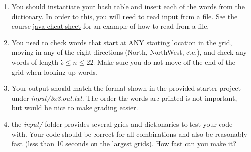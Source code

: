 \documentclass[paper=a4, fontsize=11pt, parskip=full]{scrartcl} %
\numberwithin{equation}{section} %
\numberwithin{figure}{section} %
\numberwithin{table}{section} %
\begin{document}
\begin{enumerate}
	\item You should instantiate your hash table and insert each of the words from the dictionary. In order to this, you will need to read input from a file. See the course \href{https://uva-cs.github.io/dsa1/java/javaCheatSheet/javaCheatSheet.pdf}{java cheat sheet} for an example of how to read from a file.
	\item You need to check words that start at ANY starting location in the grid, moving in any of the eight directions (North, NorthWest, etc.), and check any words of length $3 \leq n \leq 22$. Make sure you do not move off the end of the grid when looking up words.
	\item Your output should match the format shown in the provided starter project under \emph{input/3x3.out.txt}. The order the words are printed is not important, but would be nice to make grading easier.
	\item the \emph{input/} folder provides several grids and dictionaries to test your code with. Your code should be correct for all combinations and also be reasonably fast (less than 10 seconds on the largest grids). How fast can you make it?
\end{enumerate}



\end{document}
